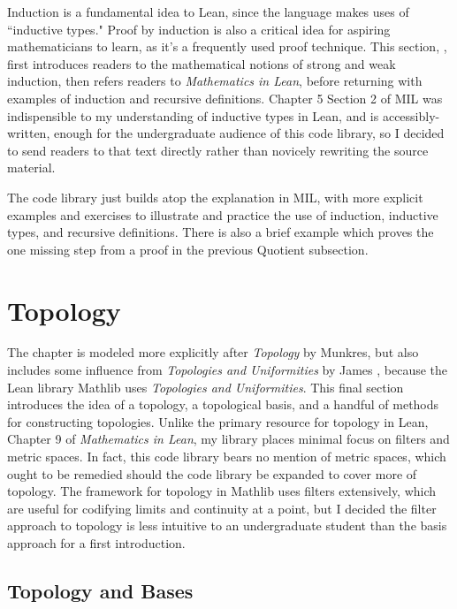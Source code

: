 Induction is a fundamental idea to Lean, since the language makes uses of
``inductive types." Proof by induction is also a critical idea for aspiring 
mathematicians to learn, as it's a frequently used proof technique. This
section, , first introduces readers to the mathematical notions
of strong and weak induction, then refers readers to \textit{Mathematics in Lean},
before returning with examples of induction and recursive definitions. Chapter 
5 Section 2 of MIL was indispensible to my understanding of inductive types in 
Lean, and is accessibly-written, enough for the undergraduate audience of this
code library, so I decided to send readers to that text directly rather than 
novicely rewriting the source material. 

The code library just builds atop the explanation in MIL, with more explicit 
examples and exercises to illustrate and practice the use of induction, 
inductive types, and recursive definitions. There is also a brief example
which proves the one missing step from a proof in the previous Quotient 
subsection.

\section{Topology}

The chapter  is modeled more explicitly after 
\textit{Topology} by Munkres, but also includes
some influence from \textit{Topologies and Uniformities}
by James \cite{Uniform}, because 
the Lean library Mathlib uses \textit{Topologies and Uniformities}.
This final section introduces the idea of a topology, a topological basis,
and a handful of methods for constructing topologies. Unlike the primary 
resource for topology in Lean, Chapter 9 of \textit{Mathematics in Lean}, 
my library places minimal focus on filters and metric spaces. In fact, 
this code library bears no mention of metric spaces, which ought to
be remedied should the code library be expanded to cover more of topology.
The framework for topology in Mathlib uses filters extensively, which
are useful for codifying limits and continuity at a point, but I decided 
the filter approach to topology is less intuitive to an undergraduate student
than the basis approach for a first introduction.

\subsection{Topology and Bases}

